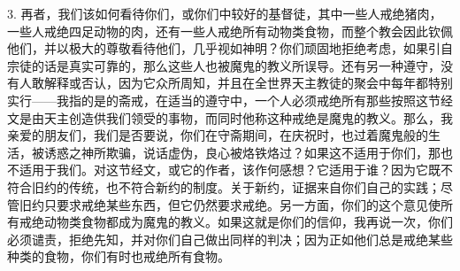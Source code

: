 3. 再者，我们该如何看待你们，或你们中较好的基督徒，其中一些人戒绝猪肉，一些人戒绝四足动物的肉，还有一些人戒绝所有动物类食物，而整个教会因此钦佩他们，并以极大的尊敬看待他们，几乎视如神明？你们顽固地拒绝考虑，如果引自宗徒的话是真实可靠的，那么这些人也被魔鬼的教义所误导。还有另一种遵守，没有人敢解释或否认，因为它众所周知，并且在全世界天主教徒的聚会中每年都特别实行——我指的是的斋戒，在适当的遵守中，一个人必须戒绝所有那些按照这节经文是由天主创造供我们领受的事物，而同时他称这种戒绝是魔鬼的教义。那么，我亲爱的朋友们，我们是否要说，你们在守斋期间，在庆祝时，也过着魔鬼般的生活，被诱惑之神所欺骗，说话虚伪，良心被烙铁烙过？如果这不适用于你们，那也不适用于我们。对这节经文，或它的作者，该作何感想？它适用于谁？因为它既不符合旧约的传统，也不符合新约的制度。关于新约，证据来自你们自己的实践；尽管旧约只要求戒绝某些东西，但它仍然要求戒绝。另一方面，你们的这个意见使所有戒绝动物类食物都成为魔鬼的教义。如果这就是你们的信仰，我再说一次，你们必须谴责，拒绝先知，并对你们自己做出同样的判决；因为正如他们总是戒绝某些种类的食物，你们有时也戒绝所有食物。\par

